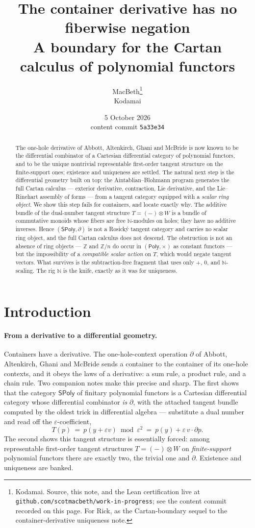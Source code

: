 \documentclass[11pt]{article}
\title{The container derivative has no fiberwise negation\\
\large A boundary for the Cartan calculus of polynomial functors}
\author{MacBeth\thanks{Kodamai. Source, this note, and the Lean certification live at
\texttt{github.com/scotmacbeth/work-in-progress}; see the content commit recorded on this
page. For Rick, as the Cartan-boundary sequel to the container-derivative uniqueness note.}\\
\small Kodamai}
\date{5 October 2026\\[2pt]
\small content commit \texttt{5a33e34}}
\theoremstyle{definition}
\newcommand{\SPoly}{\mathsf{SPoly}}
\newcommand{\Poly}{\mathsf{Poly}}
\newcommand{\N}{\mathbb{N}}
\newcommand{\Z}{\mathbb{Z}}
\begin{document}
\maketitle

\begin{abstract}
The one-hole derivative of Abbott, Altenkirch, Ghani and McBride is now known to be the
differential combinator of a Cartesian differential category of polynomial functors, and
to be the unique nontrivial representable first-order tangent structure on the
finite-support ones; existence and uniqueness are settled. The natural next step is the
differential geometry built on top: the Aintablian--Blohmann program generates the full
Cartan calculus --- exterior derivative, contraction, Lie derivative, and the
Lie--Rinehart assembly of forms --- from a tangent category equipped with a \emph{scalar
ring object}. We show this step fails for containers, and locate exactly why. The additive
bundle of the dual-number tangent structure $T=(-)\otimes W$ is a bundle of commutative
monoids whose fibers are free $\N$-modules on holes; they have no additive inverses. Hence
$(\SPoly,\partial)$ is not a Rosick\'y tangent category and carries no scalar ring object,
and the full Cartan calculus does not descend. The obstruction is not an absence of ring
objects --- $\Z$ and $\Z/n$ do occur in $(\Poly,\times)$ as constant functors --- but the
impossibility of a \emph{compatible scalar action} on $T$, which would negate tangent
vectors. What survives is the subtraction-free fragment that uses only $+$, $0$, and
$\N$-scaling. The rig $\N$ is the knife, exactly as it was for uniqueness.
\end{abstract}

\section{Introduction}\label{sec:intro}

\paragraph{From a derivative to a differential geometry.}
Containers \cite{AAGM2003,GambinoKock2013} have a derivative. The one-hole-context
operation $\partial$ of Abbott, Altenkirch, Ghani and McBride sends a container to the
container of its one-hole contexts, and it obeys the laws of a derivative: a sum rule, a
product rule, and a chain rule. Two companion notes make this precise and sharp. The first
\cite{MacBethTangent} shows that the category $\SPoly$ of finitary polynomial functors is a
Cartesian differential category whose differential combinator \emph{is} $\partial$, with
the attached tangent bundle computed by the oldest trick in differential algebra ---
substitute a dual number and read off the $\varepsilon$-coefficient,
\[
   T(p)\ =\ p(y+\varepsilon v)\bmod \varepsilon^2\ =\ p(y)+\varepsilon\, v\cdot\partial p .
\]
The second \cite{MacBethUniqueness} shows this tangent structure is essentially forced:
among representable first-order tangent structures $T=(-)\otimes W$ on \emph{finite-support}
polynomial functors there are exactly two, the trivial one and $\partial$. Existence and
uniqueness are banked.
\end{document}
